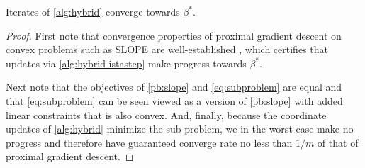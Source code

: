\begin{theorem}
  Iterates of \cref{alg:hybrid} converge towards \(\beta^*\).
\end{theorem}
\begin{proof}
  First note that convergence properties of proximal gradient descent on convex
  problems such as SLOPE are well-established
  \parencite{beck2009,daubechies2004}, which certifies that updates via
  \cref{alg:hybrid-istastep} make progress towards \(\beta^*\).

  Next note that the objectives of \eqref{pb:slope} and
  \eqref{eq:subproblem} are equal and that \eqref{eq:subproblem} can be seen
  viewed as a version of \eqref{pb:slope} with added linear constraints
  that is also convex. And, finally, because the coordinate updates of
  \cref{alg:hybrid} minimize the sub-problem, we in the worst case make no
  progress and therefore have guaranteed converge rate no less than \(1/m\)
  of that of proximal gradient descent.
\end{proof}

